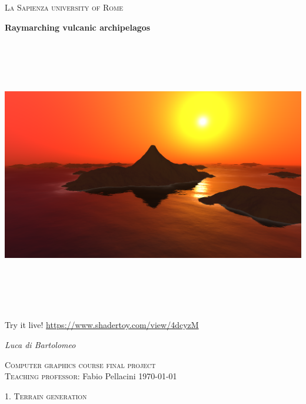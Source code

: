 \documentclass[a4paper,10pt]{article} %
\newcommand{\tsection}[1]{%
    {\center \bigbreak \par \hfil \huge \textsc {#1}} \bigbreak \par}
\begin{document}
\begin{titlepage}
    \centering
    \vbox{}
    \vspace{1.5cm}
    {\scshape\LARGE La Sapienza university of Rome  \par}
    \vspace{2cm}
    {\Huge \bfseries Raymarching vulcanic archipelagos \par}
    \vspace{1cm}
    \includegraphics[width=\textwidth, height=12cm]{main2} \par
    Try it live! \url{https://www.shadertoy.com/view/4dcyzM} \par
    \vfill \par
    \Large
    \emph{ Luca di Bartolomeo} \par
    \vspace{1cm}
    \textsc{Computer graphics course final project \\ Teaching professor: }  Fabio Pellacini
    \vfill
    \today


\end{titlepage}

\tsection{1. Terrain generation}

\end{document}
